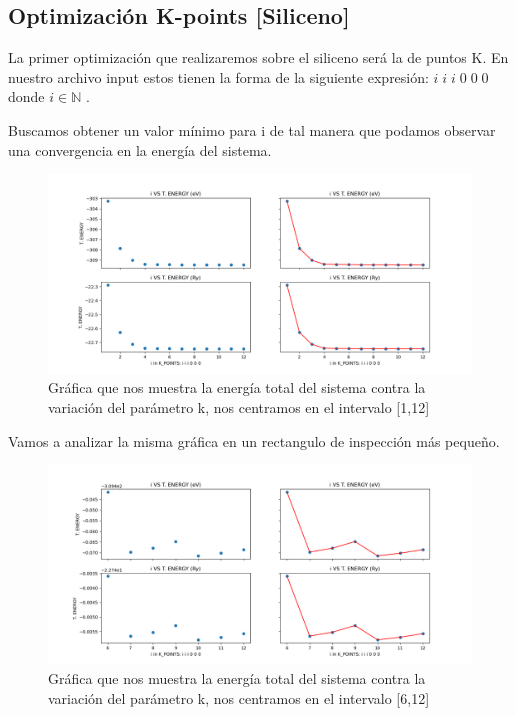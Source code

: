 \newpage



\subsection{Optimización K-points [Siliceno]}

La primer optimización que realizaremos sobre el siliceno será la de puntos K. En nuestro archivo input estos
tienen la forma de la siguiente expresión: $ i \; i \; i \; 0 \; 0 \; 0$ donde $ i \in \mathbb{N}  $ .

\vspace{0.5cm}

Buscamos obtener un valor mínimo para i de tal manera que podamos observar una convergencia en la 
energía del sistema.

\begin{figure}[H]
    \centering
    \includegraphics[scale=0.46]{images_siliceno/k_points_vs_t_energy_1_12.png}
    \caption{Gráfica que nos muestra la energía total del sistema contra la variación del parámetro k, nos centramos en el intervalo [1,12]}
\end{figure}

Vamos a analizar la misma gráfica en un rectangulo de inspección más pequeño.

\begin{figure}[H]
    \centering
    \includegraphics[scale=0.46]{images_siliceno/k_points_vs_t_energy_6_12.png}
    \caption{Gráfica que nos muestra la energía total del sistema contra la variación del parámetro k, nos centramos en el intervalo [6,12]}
\end{figure}

